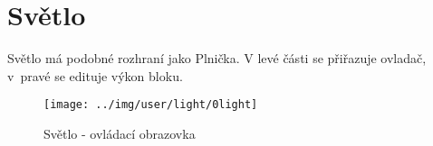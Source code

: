 
\section{Světlo}

Světlo má podobné rozhraní jako Plnička. V levé části se přiřazuje ovladač, v~pravé se edituje výkon bloku.

\begin{figure}[!ht]\centering
\texttt{[image: ../img/user/light/0light]}

\caption{Světlo - ovládací obrazovka}
\label{fig:user_light_0light}

\end{figure}

\FloatBarrier
